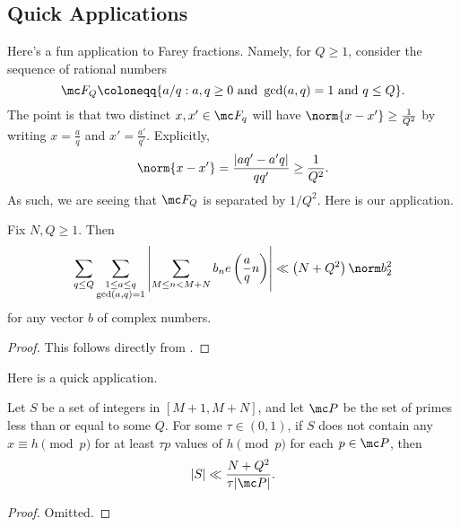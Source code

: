 \documentclass[../notes.tex]{subfiles}
\begin{document}
\subsection{Quick Applications}
Here's a fun application to Farey fractions. Namely, for $Q\ge1$, consider the sequence of rational numbers
\[\mc F_Q\coloneqq\{a/q:a,q\ge0\text{ and }\gcd(a,q)=1\text{ and }q\le Q\}.\]
The point is that two distinct $x,x'\in\mc F_q$ will have $\norm{x-x'}\ge\frac1{Q^2}$ by writing $x=\frac aq$ and $x'=\frac{a'}{q'}$. Explicitly,
\[\norm{x-x'}=\frac{|aq'-a'q|}{qq'}\ge\frac1{Q^2}.\]
As such, we are seeing that $\mc F_Q$ is separated by $1/Q^2$. Here is our application.
\begin{corollary}
	Fix $N,Q\ge1$. Then
	\[\sum_{q\le Q}\sum_{\substack{1\le a\le q\\\gcd(a,q)=1}}\left|\sum_{M\le n<M+N}b_ne\left(\frac aqn\right)\right|\ll\left(N+Q^2\right)\norm b_2^2\]
	for any vector $b$ of complex numbers.
\end{corollary}
\begin{proof}
	This follows directly from .
\end{proof}
Here is a quick application.
\begin{theorem}
	Let $S$ be a set of integers in $[M+1,M+N]$, and let $\mc P$ be the set of primes less than or equal to some $Q$. For some $\tau\in(0,1)$, if $S$ does not contain any $x\equiv h\pmod p$ for at least $\tau p$ values of $h\pmod p$ for each $p\in\mc P$, then
	\[|S|\ll\frac{N+Q^2}{\tau|\mc P|}.\]
\end{theorem}
\begin{proof}
	Omitted.
\end{proof}
\end{document}
